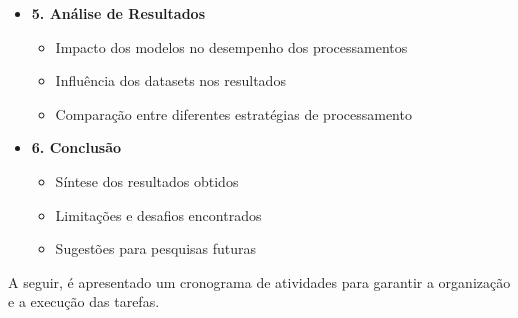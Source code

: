 \begin{itemize}
    \item \textbf{5. Análise de Resultados}
    \begin{itemize}
        \item Impacto dos modelos no desempenho dos processamentos
        \item Influência dos datasets nos resultados
        \item Comparação entre diferentes estratégias de processamento
    \end{itemize}

    \item \textbf{6. Conclusão}
    \begin{itemize}
        \item Síntese dos resultados obtidos
        \item Limitações e desafios encontrados
        \item Sugestões para pesquisas futuras
    \end{itemize}
\end{itemize}

A seguir, é apresentado um cronograma de atividades para garantir a organização e a execução das tarefas.

\renewcommand{\arraystretch}{1.5}
\begin{table}[h!]
    \centering
    \caption{Cronograma de Atividades}
    \label{tab:cronograma}
\end{table}
